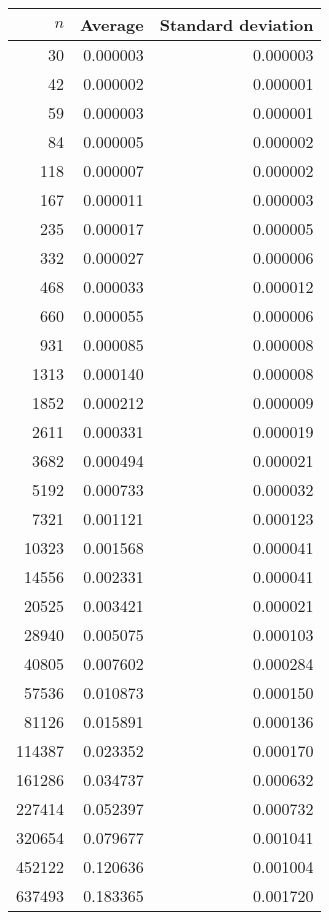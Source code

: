 \begin{tabular}{rrr}
$n$ & Average & Standard deviation\\\hline
30 & 0.000003 & 0.000003\\
42 & 0.000002 & 0.000001\\
59 & 0.000003 & 0.000001\\
84 & 0.000005 & 0.000002\\
118 & 0.000007 & 0.000002\\
167 & 0.000011 & 0.000003\\
235 & 0.000017 & 0.000005\\
332 & 0.000027 & 0.000006\\
468 & 0.000033 & 0.000012\\
660 & 0.000055 & 0.000006\\
931 & 0.000085 & 0.000008\\
1313 & 0.000140 & 0.000008\\
1852 & 0.000212 & 0.000009\\
2611 & 0.000331 & 0.000019\\
3682 & 0.000494 & 0.000021\\
5192 & 0.000733 & 0.000032\\
7321 & 0.001121 & 0.000123\\
10323 & 0.001568 & 0.000041\\
14556 & 0.002331 & 0.000041\\
20525 & 0.003421 & 0.000021\\
28940 & 0.005075 & 0.000103\\
40805 & 0.007602 & 0.000284\\
57536 & 0.010873 & 0.000150\\
81126 & 0.015891 & 0.000136\\
114387 & 0.023352 & 0.000170\\
161286 & 0.034737 & 0.000632\\
227414 & 0.052397 & 0.000732\\
320654 & 0.079677 & 0.001041\\
452122 & 0.120636 & 0.001004\\
637493 & 0.183365 & 0.001720\\
\end{tabular}
